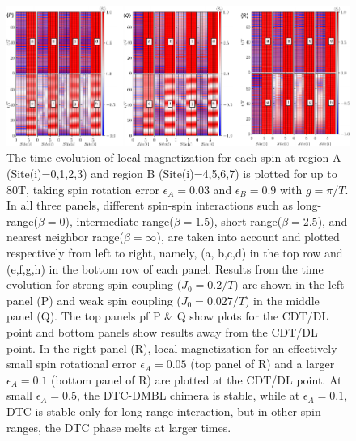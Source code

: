 \documentclass[%
nofootinbib,
reprint,
superscriptaddress,
amsmath,amssymb,showkeys,
aps,
prb,
]{revtex4-2}
\begin{document}
\begin{figure}[t!]
		\centering
		\includegraphics[width=17.5cm]{sz_t_strongweakJ_ea_N_8.pdf}
		\caption{The time evolution of local magnetization for each spin at region A (Site(i)=0,1,2,3) and region B (Site(i)=4,5,6,7) is plotted for up to 80T, taking spin rotation error $\epsilon_A = 0.03$ and $\epsilon_B = 0.9$ with $g=\pi/T$.  In all three panels, different spin-spin interactions such as long-range($\beta=0$), intermediate range($\beta=1.5$), short range($\beta=2.5$), and nearest neighbor range($\beta=\infty$), are taken into account and plotted respectively from left to right, namely, (a, b,c,d) in the top row and (e,f,g,h) in the bottom row of each panel. Results from the time evolution for strong spin coupling ($J_0 = 0.2/T$) are shown in the left panel (P) and weak spin coupling ($J_0 = 0.027/T$) in the middle panel (Q). The top panels pf P \& Q show plots  for the CDT/DL point  and bottom panels show results away from the CDT/DL point. In the right panel (R), local magnetization for an effectively small spin rotational error $\epsilon_A = 0.05$ (top panel of R) and a larger $\epsilon_A = 0.1$ (bottom panel of R) are plotted at the CDT/DL point. At small $\epsilon_A=0.5$, the DTC-DMBL chimera is stable, while at $\epsilon_A=0.1$, DTC is stable only for long-range interaction, but in other spin ranges, the DTC phase melts at larger times.}
		\label{Fig:strong_weak_ea}
	\end{figure}
\end{document}
